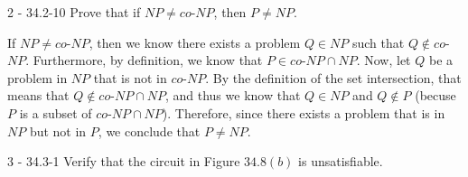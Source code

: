 \documentclass[11pt]{article}
\begin{document}
\begin{prob}{2 - 34.2-10}
Prove that if $NP \not= co$-$NP$, then $P \not= NP$.
\end{prob}
\begin{sol}
If $NP \not= co$-$NP$, then we know there exists a problem $Q \in NP$ such that $Q \notin co$-$NP$.  Furthermore, by definition, we know that $P \in co$-$NP \cap NP$. Now, let $Q$ be a problem in $NP$ that is not in $co$-$NP$. By the definition of the set intersection, that means that $Q \notin co$-$NP \cap NP$, and thus we know that $Q \in NP$ and $Q \notin P$ (becuse $P$ is a subset of $co$-$NP \cap NP$). Therefore, since there exists a problem that is in $NP$ but not in $P$, we conclude that $P \not= NP$. 
\end{sol}

\begin{prob}{3 - 34.3-1}
Verify that the circuit in Figure $34.8(b)$ is unsatisfiable.
\end{prob}
\end{document}
